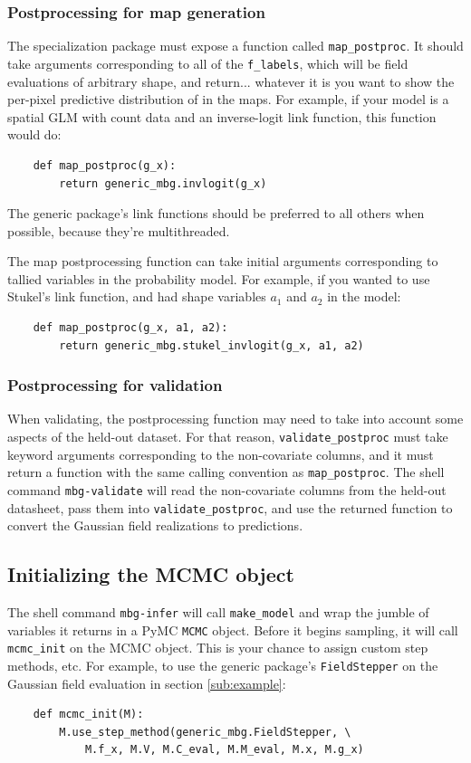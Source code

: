 \subsubsection{Postprocessing for map generation}
The specialization package must expose a function called \texttt{map\_postproc}. It should take arguments corresponding to all of the \texttt{f\_labels}, which will be field evaluations of arbitrary shape, and return... whatever it is you want to show the per-pixel predictive distribution of in the maps. For example, if your model is a spatial GLM with count data and an inverse-logit link function, this function would do:
\begin{verbatim}
    def map_postproc(g_x):
        return generic_mbg.invlogit(g_x)
\end{verbatim}
The generic package's link functions should be preferred to all others when possible, because they're multithreaded.

The map postprocessing function can take initial arguments corresponding to tallied variables in the probability model. For example, if you wanted to use Stukel's link function, and had shape variables $a_1$ and $a_2$ in the model:
\begin{verbatim}
    def map_postproc(g_x, a1, a2):
        return generic_mbg.stukel_invlogit(g_x, a1, a2)
\end{verbatim}

\subsubsection{Postprocessing for validation} 
When validating, the postprocessing function may need to take into account some aspects of the held-out dataset. For that reason, \texttt{validate\_postproc} must take keyword arguments corresponding to the non-covariate columns, and it must return a function with the same calling convention as \texttt{map\_postproc}. The shell command \texttt{mbg-validate} will read the non-covariate columns from the held-out datasheet, pass them into \texttt{validate\_postproc}, and use the returned function to convert the Gaussian field realizations to predictions.

\subsection{Initializing the MCMC object}
\label{sub:mcmc-init} 

The shell command \texttt{mbg-infer} will call \texttt{make\_model} and wrap the jumble of variables it returns in a PyMC \texttt{MCMC} object. Before it begins sampling, it will call \texttt{mcmc\_init} on the MCMC object. This is your chance to assign custom step methods, etc. For example, to use the generic package's \texttt{FieldStepper} on the Gaussian field evaluation in section \ref{sub:example}:
\begin{verbatim}
    def mcmc_init(M):
        M.use_step_method(generic_mbg.FieldStepper, \
            M.f_x, M.V, M.C_eval, M.M_eval, M.x, M.g_x)
\end{verbatim}
